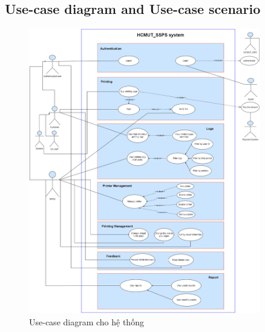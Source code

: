 \subsection{Use-case diagram and Use-case scenario}
\newpage
\begin{figure}[H]
    \begin{center}
        \includegraphics[width=0.9\textwidth]{Images/Requirement Elicitation/SPSS_system_Use-case.png}
        \caption{Use-case diagram cho hệ thống}
        \label{fig:arch}
    \end{center}
\end{figure}


